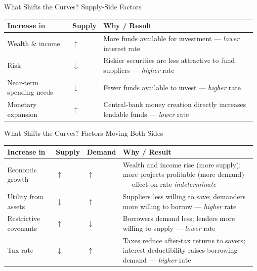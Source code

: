 \documentclass[aspectratio=169]{beamer}
\begin{document}
\begin{frame}{What Shifts the Curves? Supply-Side Factors}
\begin{table}
\centering
\small
\begin{tabular}{p{}p{}p{}}
\toprule
\textbf{Increase in} & \textbf{Supply} & \textbf{Why / Result} \\
\midrule
Wealth \& income & $\uparrow$ & More funds available for investment --- \emph{lower} interest rate \\
Risk & $\downarrow$ & Riskier securities are less attractive to fund suppliers --- \emph{higher} rate \\
Near-term spending needs & $\downarrow$ & Fewer funds available to invest --- \emph{higher} rate \\
Monetary expansion & $\uparrow$ & Central-bank money creation directly increases lendable funds --- \emph{lower} rate \\
\bottomrule
\end{tabular}
\end{table}
\end{frame}

\begin{frame}{What Shifts the Curves? Factors Moving Both Sides}
\begin{table}
\centering
\small
\begin{tabular}{p{}p{}p{}p{}}
\toprule
\textbf{Increase in} & \textbf{Supply} & \textbf{Demand} & \textbf{Why / Result} \\
\midrule
Economic growth & $\uparrow$ & $\uparrow$ & Wealth and income rise (more supply); more projects profitable (more demand) --- effect on rate \emph{indeterminate} \\
Utility from assets & $\downarrow$ & $\uparrow$ & Suppliers less willing to save; demanders more willing to borrow --- \emph{higher} rate \\
Restrictive covenants & $\uparrow$ & $\downarrow$ & Borrowers demand less; lenders more willing to supply --- \emph{lower} rate \\
Tax rate & $\downarrow$ & $\uparrow$ & Taxes reduce after-tax returns to savers; interest deductibility raises borrowing demand --- \emph{higher} rate \\
\bottomrule
\end{tabular}
\end{table}
\end{frame}
\end{document}
